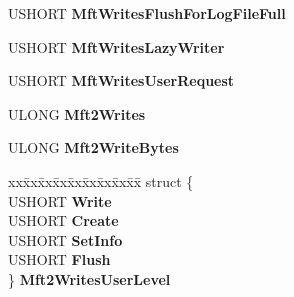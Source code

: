 \begin{DoxyCompactItemize}
\begin{tabbing}
\end{tabbing}\item 
\mbox{\label{struct___n_t_f_s___s_t_a_t_i_s_t_i_c_s_aedbb6339df6108da78555f38da3b4450}} 
U\+S\+H\+O\+RT {\bfseries Mft\+Writes\+Flush\+For\+Log\+File\+Full}
\item 
\mbox{\label{struct___n_t_f_s___s_t_a_t_i_s_t_i_c_s_a4d2fa6aa5fbbe98b8d0f29c40b044c2a}} 
U\+S\+H\+O\+RT {\bfseries Mft\+Writes\+Lazy\+Writer}
\item 
\mbox{\label{struct___n_t_f_s___s_t_a_t_i_s_t_i_c_s_a98f93831a1e06dd9f135e15e4b4c5711}} 
U\+S\+H\+O\+RT {\bfseries Mft\+Writes\+User\+Request}
\item 
\mbox{\label{struct___n_t_f_s___s_t_a_t_i_s_t_i_c_s_ac838886a1ecffdeb99cac84a34f50713}} 
U\+L\+O\+NG {\bfseries Mft2\+Writes}
\item 
\mbox{\label{struct___n_t_f_s___s_t_a_t_i_s_t_i_c_s_a13751d0bfaeeec6e65fb03a3def752dd}} 
U\+L\+O\+NG {\bfseries Mft2\+Write\+Bytes}
\item 
\mbox{\label{struct___n_t_f_s___s_t_a_t_i_s_t_i_c_s_a4603c1425cfa4a923397177e69bdc9dc}} 
\begin{tabbing}
xx\=xx\=xx\=xx\=xx\=xx\=xx\=xx\=xx\=\kill
struct \{\\
\>USHORT {\bfseries Write}\\
\>USHORT {\bfseries Create}\\
\>USHORT {\bfseries SetInfo}\\
\>USHORT {\bfseries Flush}\\
\} {\bfseries Mft2WritesUserLevel}\\


\end{tabbing}
\end{DoxyCompactItemize}

